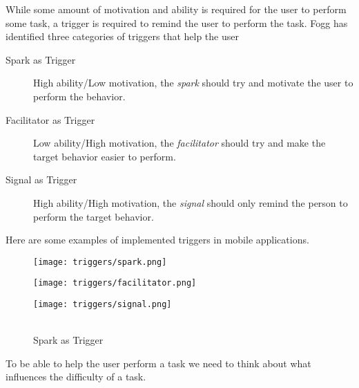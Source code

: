 While some amount of motivation and ability is required for the user to perform some task, a trigger is required to remind the user to perform the task. Fogg has identified three categories of triggers that help the user

\begin{description}
  \item[Spark as Trigger] High ability/Low motivation, the \textit{spark} should try and motivate the user to perform the behavior.
  \item[Facilitator as Trigger] Low ability/High motivation, the \textit{facilitator} should try and make the target behavior easier to perform.
  \item[Signal as Trigger]  High ability/High motivation, the \textit{signal} should only remind the person to perform the target behavior.
\end{description}

Here are some examples of implemented triggers in mobile applications.

\begin{figure}
\centering
\captionsetup{format=multiline,font=footnotesize}
\begin{minipage}{.33333\textwidth}
  \centering
  \texttt{[image: triggers/spark.png]}%
  \caption{\\Spark as Trigger}
  \label{fig:spark}
\end{minipage}%
\begin{minipage}{.33333\textwidth}
  \centering
  \texttt{[image: triggers/facilitator.png]}%
  \label{fig:facilitator}
\end{minipage}%
\begin{minipage}{.33333\textwidth}
  \centering
  \texttt{[image: triggers/signal.png]}%
  \label{fig:signal}
\end{minipage}
\end{figure}

To be able to help the user perform a task we need to think about what influences the difficulty of a task.

